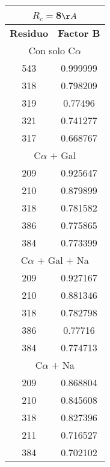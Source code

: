 \begin{tabular}[c]{|c|c|}
\multicolumn{2}{c}{$R_c=$8$\AA$}\\\hline
\textbf{Residuo}&\textbf{Factor B}\\\hline
\multicolumn{2}{c}{Con solo C$\alpha$}\\\hline
       543&  0.999999\\
       318&  0.798209\\
       319&   0.77496\\
       321&  0.741277\\
       317&  0.668767\\
\hline
\multicolumn{2}{c}{C$\alpha$ $+$ Gal}\\\hline
       209&  0.925647\\
       210&  0.879899\\
       318&  0.781582\\
       386&  0.775865\\
       384&  0.773399\\
\hline
\multicolumn{2}{c}{C$\alpha$ $+$ Gal $+$ Na}\\\hline
       209&  0.927167\\
       210&  0.881346\\
       318&  0.782798\\
       386&   0.77716\\
       384&  0.774713\\
\hline
\multicolumn{2}{c}{C$\alpha$ $+$ Na}\\\hline
       209&  0.868804\\
       210&  0.845608\\
       318&  0.827396\\
       211&  0.716527\\
       384&  0.702102\\
\hline
\end{tabular}
